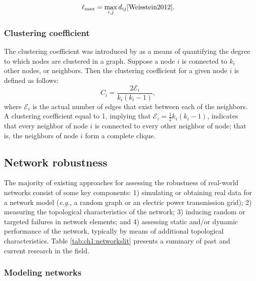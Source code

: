 %
\begin{equation}
\ell_{\text{max}}=\max_{i,j}d_{ij}\cite{Weisstein2012}.
\end{equation}


\subsubsection{Clustering coefficient}

The clustering coefficient was introduced by \cite{Watts1998} as a means of quantifying the degree to which nodes are clustered in a graph.  Suppose a node $i$ is connected to $k_{i}$ other nodes, or neighbors. Then the clustering coefficient for a given node $i$ is defined as follows:
%
\begin{equation}
C_{i}=\frac{2\mathcal{E}_{i}}{k_{i}(k_{i}-1)},
\end{equation}
%
where $\mathcal{E}_{i}$ is the actual number of edges that exist between each of the neighbors. A clustering coefficient equal to 1, implying that $\mathcal{E}_{i}=\frac{1}{2}k_{i}(k_{i}-1)$, indicates that every neighbor of node $i$ is connected to every other neighbor of node; that is, the neighbors of node $i$ form a complete clique.


\subsection{Network robustness}

The majority of existing approaches for assessing the robustness of real-world networks consist of some key components: 1) simulating or obtaining real data for a network model (\emph{e.g.}, a random graph or an electric power transmission grid); 2) measuring the topological characteristics of the network; 3) inducing random or targeted failures in network elements; and 4) assessing static and/or dynamic performance of the network, typically by means of additional topological characteristics.  Table \ref{tab:ch1:networkslit} presents a summary of past and current research in the field.


\subsubsection{Modeling networks}

